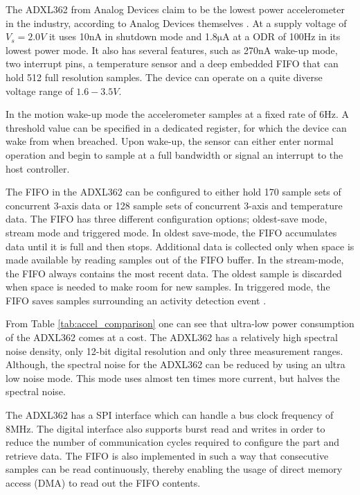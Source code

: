 The ADXL362 from Analog Devices claim to be the lowest power accelerometer in the industry, according to Analog Devices themselves \cite{analog12}. At a supply voltage of $V_s = 2.0 V$ it uses 10nA in shutdown mode and 1.8$\si{\micro\ampere}$ at a ODR of 100Hz in its lowest power mode. It also has several features, such as 270nA wake-up mode, two interrupt pins, a temperature sensor and a deep embedded FIFO that can hold 512 full resolution samples. The device can operate on a quite diverse voltage range of $1.6-3.5V$.

In the motion wake-up mode the accelerometer samples at a fixed rate of 6Hz. A threshold value can be specified in a dedicated register, for which the device can wake from when breached. Upon wake-up, the sensor can either enter normal operation and begin to sample at a full bandwidth or signal an interrupt to the host controller.

The FIFO in the ADXL362 can be configured to either hold 170 sample sets of concurrent 3-axis data or 128 sample sets of concurrent 3-axis and temperature data. The FIFO has three different configuration options; oldest-save mode, stream mode and triggered mode. In oldest save-mode, the  FIFO accumulates data until it is full and then stops. Additional data is collected only when space is made available by reading samples out of the FIFO buffer. In the stream-mode, the FIFO always contains the most recent data. The oldest sample is discarded when space is needed to make room for new samples. In triggered mode, the FIFO saves samples surrounding an activity detection event \cite[p~38]{ADXL362}.

From Table \ref{tab:accel_comparison} one can see that ultra-low power consumption of the ADXL362 comes at a cost. The ADXL362 has a relatively high spectral noise density, only 12-bit digital resolution and only three measurement ranges. Although, the spectral noise for the ADXL362 can be reduced by using an ultra low noise mode. This mode uses almost ten times more current, but halves the spectral noise.

The ADXL362 has a SPI interface which can handle a bus clock frequency of 8MHz. The digital interface also supports burst read and writes in order to reduce the number of communication cycles required to configure the part and retrieve data. The FIFO is also implemented in such a way that consecutive samples can be read continuously, thereby enabling the usage of direct memory access (DMA) to read out the FIFO contents.

